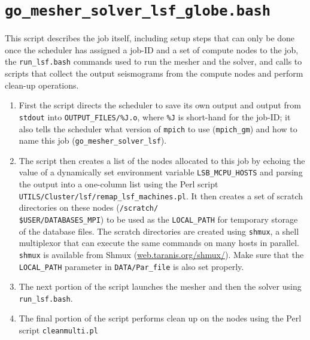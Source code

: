 \documentclass[oneside,english]{book}
\newcommand{\urlwithparentheses}[1]{(\url{#1})}
\begin{document}
\section{\texttt{go\_mesher\_solver\_lsf\_globe.bash}}

This script describes the job itself, including setup steps that can
only be done once the scheduler has assigned a job-ID and a set of
compute nodes to the job, the \texttt{run\_lsf.bash} commands used
to run the mesher and the solver, and calls to scripts that collect
the output seismograms from the compute nodes and perform clean-up
operations.

\begin{enumerate}
\item First the script directs the scheduler to save its own output and
output from \texttt{stdout} into \texttt{\small OUTPUT\_FILES/\%J.o},
where \texttt{\%J} is short-hand for the job-ID; it also tells the
scheduler what version of \texttt{mpich} to use (\texttt{mpich\_gm})
and how to name this job (\texttt{go\_mesher\_solver\_lsf}).
\item The script then creates a list of the nodes allocated to this job
by echoing the value of a dynamically set environment variable \texttt{LSB\_MCPU\_HOSTS}
and parsing the output into a one-column list using the Perl script
\texttt{UTILS/Cluster/lsf/remap\_lsf\_machines.pl}. It then creates a set of scratch
directories on these nodes (\texttt{\small /scratch/}~\\
\texttt{\small \$USER/DATABASES\_MPI}) to be used as the \texttt{LOCAL\_PATH}
for temporary storage of the database files. The scratch directories
are created using \texttt{shmux}, a shell multiplexor that can execute
the same commands on many hosts in parallel. \texttt{shmux} is available
from Shmux \urlwithparentheses{web.taranis.org/shmux/}. Make sure that the \texttt{LOCAL\_PATH}
parameter in \texttt{DATA/Par\_file} is also set properly.
\item The next portion of the script launches the mesher and then the solver
using \texttt{run\_lsf.bash}.
\item The final portion of the script performs clean up on the nodes using
the Perl script \texttt{cleanmulti.pl}
\end{enumerate}
\end{document}
